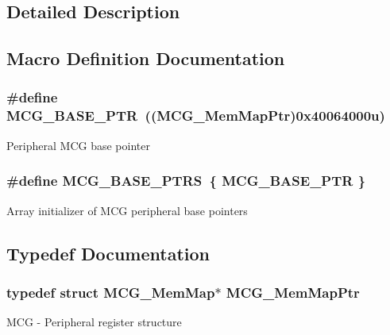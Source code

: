\subsection{Detailed Description}


\subsection{Macro Definition Documentation}
\hypertarget{group___m_c_g___peripheral_gaceefc72e93a47a35f59a31c57dddf41b}{}
\subsubsection[{M\+C\+G\+\_\+\+B\+A\+S\+E\+\_\+\+P\+T\+R}]{\setlength{\rightskip}{0pt plus 5cm}\#define M\+C\+G\+\_\+\+B\+A\+S\+E\+\_\+\+P\+T\+R~(({\bf M\+C\+G\+\_\+\+Mem\+Map\+Ptr})0x40064000u)}\label{group___m_c_g___peripheral_gaceefc72e93a47a35f59a31c57dddf41b}
Peripheral M\+C\+G base pointer \hypertarget{group___m_c_g___peripheral_ga3e6aec328b7327acc1f7bff70bec388c}{}
\subsubsection[{M\+C\+G\+\_\+\+B\+A\+S\+E\+\_\+\+P\+T\+R\+S}]{\setlength{\rightskip}{0pt plus 5cm}\#define M\+C\+G\+\_\+\+B\+A\+S\+E\+\_\+\+P\+T\+R\+S~\{ {\bf M\+C\+G\+\_\+\+B\+A\+S\+E\+\_\+\+P\+T\+R} \}}\label{group___m_c_g___peripheral_ga3e6aec328b7327acc1f7bff70bec388c}
Array initializer of M\+C\+G peripheral base pointers 

\subsection{Typedef Documentation}
\hypertarget{group___m_c_g___peripheral_ga1cb93dd00863c129e7753ec45a7c3563}{}
\subsubsection[{M\+C\+G\+\_\+\+Mem\+Map\+Ptr}]{\setlength{\rightskip}{0pt plus 5cm}typedef struct {\bf M\+C\+G\+\_\+\+Mem\+Map}$\ast$ {\bf M\+C\+G\+\_\+\+Mem\+Map\+Ptr}}\label{group___m_c_g___peripheral_ga1cb93dd00863c129e7753ec45a7c3563}
M\+C\+G -\/ Peripheral register structure 